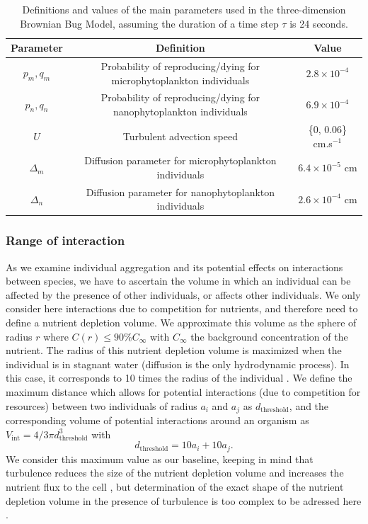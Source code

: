 \documentclass[english]{article}
\providecommand{\tabularnewline}{\\}
\begin{document}
\begin{table}[H]
\begin{centering}
\begin{tabular}{|c|c|c|}
\hline 
Parameter & Definition & Value\tabularnewline
\hline 
$p_{m},q_{m}$ & Probability of reproducing/dying for microphytoplankton individuals & $2.8\times10^{-4}$\tabularnewline
$p_{n},q_{n}$ & Probability of reproducing/dying for nanophytoplankton individuals & $6.9\times10^{-4}$\tabularnewline
$U$ & Turbulent advection speed & \{0, 0.06\} cm.s$^{-1}$\tabularnewline
$\Delta_{m}$ & Diffusion parameter for microphytoplankton individuals & $6.4\times10^{-5}$ cm\tabularnewline
$\Delta_{n}$ & Diffusion parameter for nanophytoplankton individuals & $2.6\times10^{-4}$ cm\tabularnewline
\hline 
\end{tabular}
\par\end{centering}
\caption{Definitions and values of the main parameters used in the three-dimension
Brownian Bug Model, assuming the duration of a time step $\tau$ is
24 seconds. \label{tab:Definition-and-value}}
\end{table}


\subsubsection*{Range of interaction}

As we examine individual aggregation and its potential effects on
interactions between species, we have to ascertain the volume in which
an individual can be affected by the presence of other individuals,
or affects other individuals. We only consider here interactions due
to competition for nutrients, and therefore need to define a nutrient
depletion volume. We approximate this volume as the sphere of radius
$r$ where $C(r)\leq90\%C_{\infty}$ with $C_{\infty}$ the background
concentration of the nutrient. The radius of this nutrient depletion
volume is maximized when the individual is in stagnant water (diffusion
is the only hydrodynamic process). In this case, it corresponds to
10 times the radius of the individual \citep{jumars_physical_1993,karp-boss_nutrient_1996}.
We define the maximum distance which allows for potential interactions
(due to competition for resources) between two individuals of radius
$a_{i}$ and $a_{j}$ as $d_{\text{threshold}}$, and the corresponding
volume of potential interactions around an organism as $V_{\text{int}}=4/3\pi d_{\text{threshold}}^{3}$
with
\begin{equation}
d_{\text{threshold}}=10a_{i}+10a_{j}.\label{eq:distance_interaction}
\end{equation}
We consider this maximum value as our baseline, keeping in mind that
turbulence reduces the size of the nutrient depletion volume and increases
the nutrient flux to the cell \citep{arnott_artificially_2021}, but
determination of the exact shape of the nutrient depletion volume
in the presence of turbulence is too complex to be adressed here \citep{karp-boss_nutrient_1996}.
\end{document}
